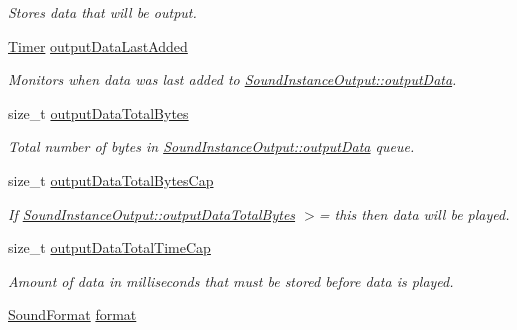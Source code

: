 \begin{DoxyCompactItemize}
\begin{DoxyCompactList}\small\item\em Stores data that will be output. \item\end{DoxyCompactList}\item 
\hyperlink{class_timer}{Timer} \hyperlink{class_sound_instance_output_a4bb8e2de55d954056ed896e0d029bab4}{outputDataLastAdded}
\begin{DoxyCompactList}\small\item\em Monitors when data was last added to \hyperlink{class_sound_instance_output_ad8422553602e12785eab486a27796da3}{SoundInstanceOutput::outputData}. \item\end{DoxyCompactList}\item 
size\_\-t \hyperlink{class_sound_instance_output_ac3f6a1350dd4cb7960ec0dafbb0d7b45}{outputDataTotalBytes}
\begin{DoxyCompactList}\small\item\em Total number of bytes in \hyperlink{class_sound_instance_output_ad8422553602e12785eab486a27796da3}{SoundInstanceOutput::outputData} queue. \item\end{DoxyCompactList}\item 
size\_\-t \hyperlink{class_sound_instance_output_acaa4c6f3eca8eddea6cfd289d07a0124}{outputDataTotalBytesCap}
\begin{DoxyCompactList}\small\item\em If \hyperlink{class_sound_instance_output_ac3f6a1350dd4cb7960ec0dafbb0d7b45}{SoundInstanceOutput::outputDataTotalBytes} $>$= this then data will be played. \item\end{DoxyCompactList}\item 
size\_\-t \hyperlink{class_sound_instance_output_a3b7132b8d865398f9b37ed6a715b3855}{outputDataTotalTimeCap}
\begin{DoxyCompactList}\small\item\em Amount of data in milliseconds that must be stored before data is played. \item\end{DoxyCompactList}\item 
\hypertarget{class_sound_instance_output_a6f868bc7e7610066ccb2ff8616a2ab4a}{
\hyperlink{class_sound_format}{SoundFormat} \hyperlink{class_sound_instance_output_a6f868bc7e7610066ccb2ff8616a2ab4a}{format}}
\label{class_sound_instance_output_a6f868bc7e7610066ccb2ff8616a2ab4a}


\end{DoxyCompactItemize}

